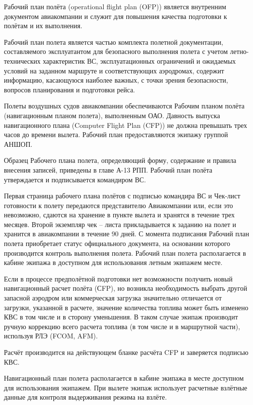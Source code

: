 Рабочий план полёта (operational flight plan (OFP)) является внутренним документом авиакомпании и служит для повышения качества подготовки к полётам и их выполнения.

Рабочий план полета является частью комплекта полетной документации, составляемого эксплуатантом для безопасного выполнения полета с учетом летно-технических характеристик ВС, эксплуатационных ограничений и ожидаемых условий на заданном маршруте и соответствующих аэродромах, содержит информацию, касающуюся наиболее важных, с точки зрения безопасности, вопросов планирования и подготовки рейса.

Полеты воздушных судов авиакомпании обеспечиваются Рабочим планом полёта (навигационным планом полета), выполненным ОАО. Давность выпуска навигационного плана (Computer Flight Plan (CFP)) не должна превышать трех часов до времени вылета. Рабочий план предоставляются экипажу группой АНШОП. 

Образец Рабочего плана полета, определяющий форму, содержание и правила внесения записей, приведены в главе А-13 РПП. Рабочий план полёта утверждается и подписывается командиром ВС. 

Первая страница рабочего плана полётов с подписью командира ВС и Чек-лист готовности к полету передаются представителю Авиакомпании или, если это невозможно, сдаются на хранение в пункте вылета и хранятся в течение трех месяцев. Второй экземпляр чек – листа прикладывается к заданию на полет и хранится в авиакомпании в течение 90 дней. С момента подписания Рабочий план полета приобретает статус официального документа, на основании которого производится контроль выполнения полета. Рабочий план полета располагается в кабине экипажа в доступном для использования летным экипажем месте.

Если в процессе предполётной подготовки нет возможности получить новый навигационный расчет полёта (СFP), но возникла необходимость выбрать другой запасной аэродром или коммерческая загрузка значительно отличается от загрузки, указанной в расчете, значение количества топлива может быть изменено КВС в том числе и в сторону уменьшения. В таком случае экипаж производит ручную коррекцию всего расчета топлива (в том числе и в маршрутной части), используя РЛЭ (FCOM, AFM). 

Расчёт производится на действующем бланке расчёта CFP и заверяется подписью КВС.

Навигационный план полета располагается в кабине экипажа в месте доступном для использования экипажем. При вылете экипаж использует расчетные взлётные данные для контроля выдерживания режима на взлёте.

